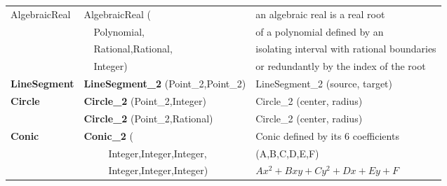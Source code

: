 \begin{ccTexOnly}
\begin{tabular}{*{3}{| l} |}
AlgebraicReal & AlgebraicReal (         & an algebraic real is a real root\\
              & \ \ Polynomial,         & of a polynomial defined by an\\
              & \ \ Rational,Rational,  & isolating interval with rational boundaries\\
              & \ \ Integer)            & or redundantly by the index of the root\\ \hline

{\bf LineSegment} & {\bf LineSegment\_2} (Point\_2,Point\_2) & LineSegment\_2 (source, target) \\ \hline

{\bf Circle}   & {\bf Circle\_2} (Point\_2,Integer) & Circle\_2 (center, radius) \\ 
               & {\bf Circle\_2} (Point\_2,Rational) & Circle\_2 (center, radius) \\ \hline

{\bf Conic}  & {\bf Conic\_2} (
                               & Conic defined by its 6 coefficients \\
             & \ \ \ \ \ Integer,Integer,Integer,
                     &  (A,B,C,D,E,F) \\
             & \ \ \ \ \ Integer,Integer,Integer)        
                     &  \begin{math} Ax^2+Bxy+Cy^2+Dx+Ey+F \end{math}\\ \hline



\end{tabular}
\end{ccTexOnly}
